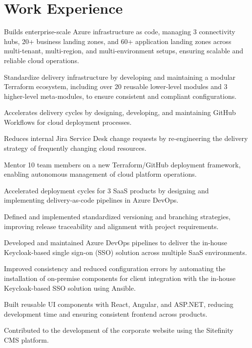 \documentclass[]{deedy-resume-openfont}
\begin{document}
\section{Work Experience}
\sectionsepsmall
{}\hfill {}
\begin{tightemize}
	\item Builds enterprise-scale Azure infrastructure as code, managing 3 connectivity hubs, 20+ business landing zones, and 60+ application landing zones across multi-tenant, multi-region, and multi-environment setups, ensuring scalable and reliable cloud operations.
	\item Standardize delivery infrastructure by developing and maintaining a modular Terraform ecosystem, including over 20 reusable lower-level modules and 3 higher-level meta-modules, to ensure consistent and compliant configurations.
	\item Accelerates delivery cycles by designing, developing, and maintaining GitHub Workflows for cloud deployment processes.
	\item Reduces internal Jira Service Desk change requests by re-engineering the delivery strategy of frequently changing cloud resources.
	\item Mentor 10 team members on a new Terraform/GitHub deployment framework, enabling autonomous management of cloud platform operations.
\end{tightemize}
\sectionsep
{}
\sectionsep
{}\hfill {}
\begin{tightemize}
	\item Accelerated deployment cycles for 3 SaaS products by designing and implementing delivery-as-code pipelines in Azure DevOps.
	\item Defined and implemented standardized versioning and branching strategies, improving release traceability and alignment with project requirements.
\end{tightemize}
\sectionsep
{}
\sectionsep
{}\hfill {}
\begin{tightemize}
	\item Developed and maintained Azure DevOps pipelines to deliver the in-house Keycloak-based single sign-on (SSO) solution across multiple SaaS environments.
	\item Improved consistency and reduced configuration errors by automating the installation of on-premise components for client integration with the in-house Keycloak-based SSO solution using Ansible.
	\item Built reusable UI components with React, Angular, and ASP.NET, reducing development time and ensuring consistent frontend across products.
	\item Contributed to the development of the corporate website using the Sitefinity CMS platform.
\end{tightemize}
\end{document}
